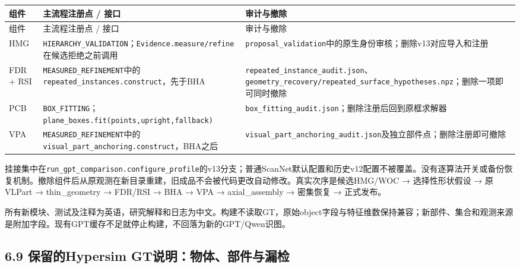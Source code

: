 \documentclass[UTF8,fontset=fandol]{ctexart}
\begin{document}
{\small
\begin{longtable}{|p{}|p{}|p{}|}
\hline
组件 & 主流程注册点 / 接口 & 审计与撤除 \\ \hline
\endfirsthead
\hline
组件 & 主流程注册点 / 接口 & 审计与撤除 \\ \hline
\endhead
HMG & \texttt{HIERARCHY\_\allowbreak{}VALIDATION}；\texttt{Evidence.\allowbreak{}measure/\allowbreak{}refine}在候选拒绝之前调用 & \texttt{proposal\_\allowbreak{}validation}中的原生身份审核；删除v13对应导入和注册 \\ \hline
FDR + RSI & \texttt{MEASURED\_\allowbreak{}REFINEMENT}中的\texttt{repeated\_\allowbreak{}instances.\allowbreak{}construct}，先于BHA & \texttt{repeated\_\allowbreak{}instance\_\allowbreak{}audit.\allowbreak{}json}、\texttt{geometry\_\allowbreak{}recovery/\allowbreak{}repeated\_\allowbreak{}surface\_\allowbreak{}hypotheses.\allowbreak{}npz}；删除一项即可同时撤除 \\ \hline
PCB & \texttt{BOX\_\allowbreak{}FITTING}；\texttt{plane\_\allowbreak{}boxes.\allowbreak{}fit(points,upright,fallback)} & \texttt{box\_\allowbreak{}fitting\_\allowbreak{}audit.\allowbreak{}json}；删除注册后回到原框求解器 \\ \hline
VPA & \texttt{MEASURED\_\allowbreak{}REFINEMENT}中的\texttt{visual\_\allowbreak{}part\_\allowbreak{}anchoring.\allowbreak{}construct}，BHA之后 & \texttt{visual\_\allowbreak{}part\_\allowbreak{}anchoring\_\allowbreak{}audit.\allowbreak{}json}及独立部件点；删除注册即可撤除 \\ \hline
\end{longtable}
}

挂接集中在\texttt{run\_\allowbreak{}gpt\_\allowbreak{}comparison.\allowbreak{}configure\_\allowbreak{}profile}的v13分支；普通ScanNet默认配置和历史v12配置不被覆盖。没有逐算法开关或备份恢复机制。撤除组件后从原观测在新目录重建，旧成品不会被代码更改自动修改。真实次序是候选HMG/WOC → 选择性形状假设 → 原VLPart → thin\_geometry → FDR/RSI → BHA → VPA → axial\_assembly → 密集恢复 → 正式发布。



所有新模块、测试及注释为英语，研究解释和日志为中文。构建不读取GT，原始object字段与特征维数保持兼容；新部件、集合和观测来源是附加字段。现有GPT缓存不足就停止构建，不回落为新的GPT/Qwen识图。



\subsection*{6.9 保留的Hypersim GT说明：物体、部件与漏检}
\end{document}
